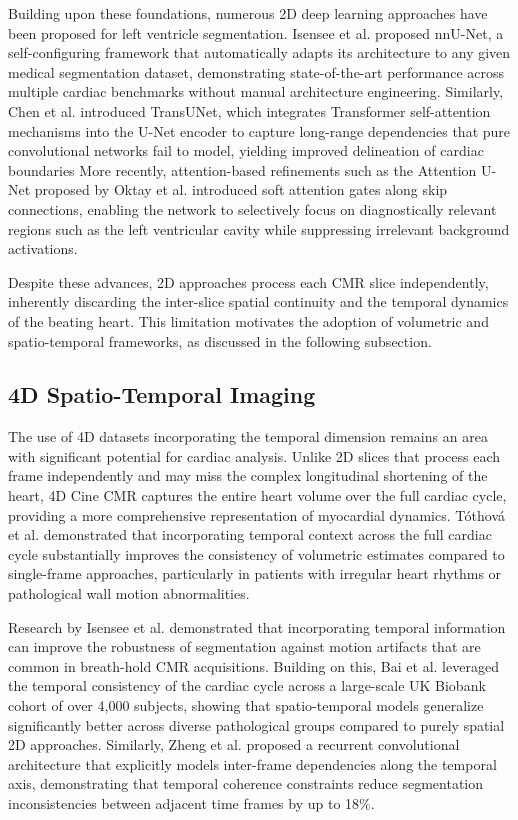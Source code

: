 \documentclass[final,3p,times,twocolumn]{elsarticle}
\begin{document}
Building upon these foundations, numerous 2D deep learning approaches have been proposed for left ventricle segmentation. Isensee et al. \cite{isensee2021nnu} proposed nnU-Net, a self-configuring framework that automatically adapts its architecture to any given medical segmentation dataset, demonstrating state-of-the-art performance across multiple cardiac benchmarks without manual architecture engineering. Similarly, Chen et al. \cite{chen2021transunet} introduced TransUNet, which integrates Transformer self-attention mechanisms into the U-Net encoder to capture long-range dependencies that pure convolutional networks fail to model, yielding improved delineation of cardiac boundaries  More recently, attention-based refinements such as the Attention U-Net proposed by Oktay et al. \cite{oktay2018attention} introduced soft attention gates along skip connections, enabling the network to selectively focus on diagnostically relevant regions such as the left ventricular cavity while suppressing irrelevant background activations.

Despite these advances, 2D approaches process each CMR slice independently, inherently discarding the inter-slice spatial continuity and the temporal dynamics of the beating heart. This limitation motivates the adoption of volumetric and spatio-temporal frameworks, as discussed in the following subsection.

\subsection{4D Spatio-Temporal Imaging}
The use of 4D datasets incorporating the temporal dimension remains an area with significant potential for cardiac analysis. Unlike 2D slices that process each frame independently and may miss the complex longitudinal shortening of the heart, 4D Cine CMR captures the entire heart volume over the full cardiac cycle, providing a more comprehensive representation of myocardial dynamics. Tóthová et al. \cite{b13} demonstrated that incorporating temporal context across the full cardiac cycle substantially improves the consistency of volumetric estimates compared to single-frame approaches, particularly in patients with irregular heart rhythms or pathological wall motion abnormalities.

Research by Isensee et al. \cite{b14} demonstrated that incorporating temporal information can improve the robustness of segmentation against motion artifacts that are common in breath-hold CMR acquisitions. Building on this, Bai et al. \cite{b15} leveraged the temporal consistency of the cardiac cycle across a large-scale UK Biobank cohort of over 4,000 subjects, showing that spatio-temporal models generalize significantly better across diverse pathological groups compared to purely spatial 2D approaches. Similarly, Zheng et al. \cite{b16} proposed a recurrent convolutional architecture that explicitly models inter-frame dependencies along the temporal axis, demonstrating that temporal coherence constraints reduce segmentation inconsistencies between adjacent time frames by up to 18\%.
\end{document}
